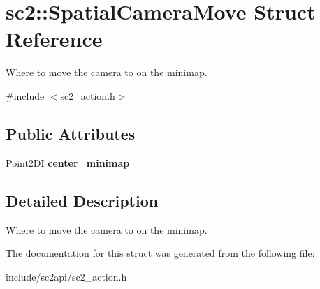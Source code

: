 \hypertarget{structsc2_1_1_spatial_camera_move}{}\section{sc2\+:\+:Spatial\+Camera\+Move Struct Reference}
\label{structsc2_1_1_spatial_camera_move}


Where to move the camera to on the minimap.  




{\ttfamily \#include $<$sc2\+\_\+action.\+h$>$}

\subsection*{Public Attributes}
\begin{DoxyCompactItemize}
\item 
\mbox{\label{structsc2_1_1_spatial_camera_move_a2b2187a5aeef5e3584eea5b7027bc659}} 
\hyperlink{structsc2_1_1_point2_d_i}{Point2\+DI} {\bfseries center\+\_\+minimap}
\end{DoxyCompactItemize}


\subsection{Detailed Description}
Where to move the camera to on the minimap. 

The documentation for this struct was generated from the following file\+:\begin{DoxyCompactItemize}
\item 
include/sc2api/sc2\+\_\+action.\+h\end{DoxyCompactItemize}
